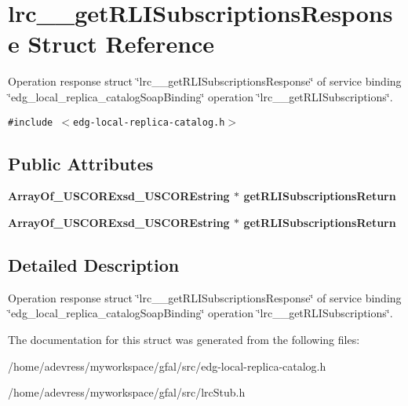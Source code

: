 \section{lrc\_\-\_\-get\-RLISubscriptions\-Response Struct Reference}
\label{structlrc____getRLISubscriptionsResponse}
Operation response struct \char`\"{}lrc\_\-\_\-get\-RLISubscriptions\-Response\char`\"{} of service binding \char`\"{}edg\_\-local\_\-replica\_\-catalog\-Soap\-Binding\char`\"{} operation \char`\"{}lrc\_\-\_\-get\-RLISubscriptions\char`\"{}.  


{\tt \#include $<$edg-local-replica-catalog.h$>$}

\subsection*{Public Attributes}
\begin{CompactItemize}
\item 
\bf{Array\-Of\_\-USCORExsd\_\-USCOREstring} $\ast$ \textbf{get\-RLISubscriptions\-Return}\label{structlrc____getRLISubscriptionsResponse_3590f593c3bd663509dc5765295ba81a}

\item 
\bf{Array\-Of\_\-USCORExsd\_\-USCOREstring} $\ast$ \textbf{get\-RLISubscriptions\-Return}\label{structlrc____getRLISubscriptionsResponse_3590f593c3bd663509dc5765295ba81a}

\end{CompactItemize}


\subsection{Detailed Description}
Operation response struct \char`\"{}lrc\_\-\_\-get\-RLISubscriptions\-Response\char`\"{} of service binding \char`\"{}edg\_\-local\_\-replica\_\-catalog\-Soap\-Binding\char`\"{} operation \char`\"{}lrc\_\-\_\-get\-RLISubscriptions\char`\"{}. 



The documentation for this struct was generated from the following files:\begin{CompactItemize}
\item 
/home/adevress/myworkspace/gfal/src/edg-local-replica-catalog.h\item 
/home/adevress/myworkspace/gfal/src/lrc\-Stub.h\end{CompactItemize}
